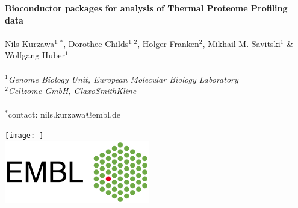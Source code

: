 \documentclass{article}
\title{}
\author{}
\date{}
\begin{document}


\begin{center}
\colorbox{lgray}{
  \begin{minipage}{.865\textwidth}
      \vspace{0.4cm}
      \huge 
      \noindent
      \textbf{Bioconductor packages for analysis of Thermal Proteome Profiling data} \\
      \vspace{0.05cm} \\
      \Large Nils Kurzawa$^{1,*}$, Dorothee Childs$^{1,2}$, Holger Franken$^2$, Mikhail M. Savitski$^1$ \& Wolfgang Huber$^1$ \\
      \vspace{0.05cm} \\
      \Large \textit{$^1$Genome Biology Unit, European Molecular Biology Laboratory} \\
      \Large \textit{$^2$Cellzome GmbH, GlaxoSmithKline} \\
      \vspace{0.05cm} \\
      \normalsize $^*$contact: nils.kurzawa@embl.de \\
  \end{minipage}
  \begin{minipage}{3.7cm}
      \texttt{[image: ]} \\
      \vspace{0.5cm}
      \includegraphics[width=1.1\linewidth, right]{figs/embl_logo.png}
  \end{minipage}
}
\end{center}
\end{document}
